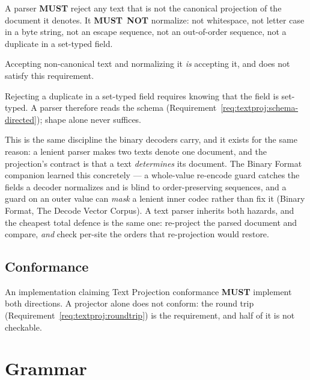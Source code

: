 \documentclass[11pt,letterpaper]{report}
\newcommand{\sectionsc}[1]{{\addfontfeatures{Letters=SmallCaps}#1}}
\newcounter{requirement}[chapter]
\newcommand{\MUST}{\textbf{MUST}}
\newcommand{\MUSTNOT}{\textbf{MUST}\nobreak\ \textbf{NOT}}
\begin{document}
\begin{requirement}
  \label{req:textproj:strict-parse}
  A parser \MUST{} reject any text that is not the canonical projection of the
  document it denotes. It \MUSTNOT{} normalize: not whitespace, not letter case
  in a byte string, not an escape sequence, not an out-of-order sequence, not a
  duplicate in a set-typed field.

  Accepting non-canonical text and normalizing it \emph{is} accepting it, and
  does not satisfy this requirement.

  Rejecting a duplicate in a set-typed field requires knowing that the field is
  set-typed. A parser therefore reads the schema
  (Requirement~\ref{req:textproj:schema-directed}); shape alone never suffices.
\end{requirement}

\begin{rationale}
  This is the same discipline the binary decoders carry, and it exists for the
  same reason: a lenient parser makes two texts denote one document, and the
  projection's contract is that a text \emph{determines} its document. The Binary
  Format companion learned this concretely --- a whole-value re-encode guard
  catches the fields a decoder normalizes and is blind to order-preserving
  sequences, and a guard on an outer value can \emph{mask} a lenient inner codec
  rather than fix it (Binary Format,
  \sectionsc{The Decode Vector Corpus}). A text parser inherits both hazards, and
  the cheapest total defence is the same one: re-project the parsed document and
  compare, \emph{and} check per-site the orders that re-projection would restore.
\end{rationale}

\section{Conformance}

\begin{requirement}
  \label{req:textproj:conformance}
  An implementation claiming Text Projection conformance \MUST{} implement both
  directions. A projector alone does not conform: the round trip
  (Requirement~\ref{req:textproj:roundtrip}) is the requirement, and half of it
  is not checkable.
\end{requirement}

\chapter{Grammar}
\label{ch:grammar}
\end{document}
